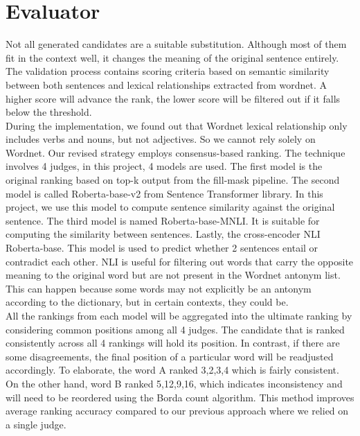\documentclass[12pt,oneside,openright,a4paper]{cpe-english-project}
\begin{document}
\section{Evaluator}
Not all generated candidates are a suitable substitution. Although most of them fit in the context well, it changes the meaning of the original sentence entirely. The validation process contains scoring criteria based on semantic similarity between both sentences and lexical relationships extracted from wordnet. A higher score will advance the rank, the lower score will be filtered out if it falls below the threshold.\\

During the implementation, we found out that Wordnet lexical relationship only includes verbs and nouns, but not adjectives. So we cannot rely solely on Wordnet. Our revised strategy employs consensus-based ranking. The technique involves 4 judges, in this project, 4 models are used. The first model is the original ranking based on top-k output from the fill-mask pipeline. The second model is called Roberta-base-v2 from Sentence Transformer library. In this project, we use this model to compute sentence similarity against the original sentence. The third model is named Roberta-base-MNLI. It is suitable for computing the similarity between sentences. Lastly, the cross-encoder NLI Roberta-base. This model is used to predict whether 2 sentences entail or contradict each other. NLI is useful for filtering out words that carry the opposite meaning to the original word but are not present in the Wordnet antonym list. This can happen because some words may not explicitly be an antonym according to the dictionary, but in certain contexts, they could be.\\
All the rankings from each model will be aggregated into the ultimate ranking by considering common positions among all 4 judges. The candidate that is ranked consistently across all 4 rankings will hold its position. In contrast, if there are some disagreements, the final position of a particular word will be readjusted accordingly. To elaborate, the word A ranked 3,2,3,4 which is fairly consistent. On the other hand, word B ranked 5,12,9,16, which indicates inconsistency and will need to be reordered using the Borda count algorithm.  This method improves average ranking accuracy compared to our previous approach where we relied on a single judge.  
\end{document}
